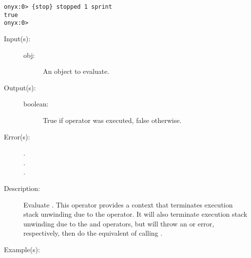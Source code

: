 \begin{description}
\begin{description}
\begin{verbatim}
onyx:0> {stop} stopped 1 sprint
true
onyx:0>
		\end{verbatim}
	\end{description}
\label{systemdict:stopped}
\item[{\onyxop{obj}{stopped}{boolean}}: ]
	\begin{description}\item[]
	\item[Input(s): ]
		\begin{description}\item[]
		\item[obj: ]
			An object to evaluate.
		\end{description}
	\item[Output(s): ]
		\begin{description}\item[]
		\item[boolean: ]
			True if 
			operator was executed, false otherwise.
		\end{description}
	\item[Error(s): ]
		\begin{description}\item[]
		\item[.]
		\item[.]
		\item[.]
		\end{description}
	\item[Description: ]
		Evaluate .  This operator provides a context that
		terminates execution stack unwinding due to the
		 operator.  It will
		also terminate execution stack unwinding due to the
		 and
		 operators, but will
		throw an  or
		 error, respectively, then do
		the equivalent of calling
		.
	\item[Example(s): ]\begin{verbatim}


\end{verbatim}
\end{description}
\end{description}
